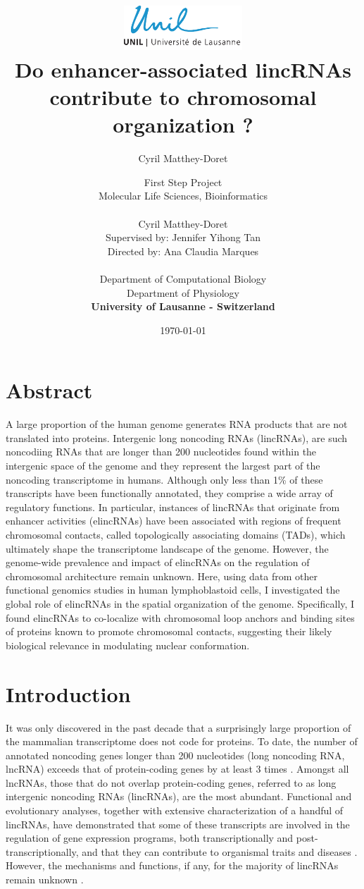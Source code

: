 \documentclass[11pt,a4paper]{report}
\author{Cyril Matthey-Doret}
\title{
\includegraphics[width=1.75in]{lo_unil06_bleu.pdf} \\
\vspace*{1in}
\textbf{Do enhancer-associated lincRNAs contribute to chromosomal organization ?}}
\author{\Large{First Step Project}\\
		Molecular Life Sciences, Bioinformatics\\
				\vspace*{0.5in} \\
		Cyril Matthey-Doret\\
        Supervised by: Jennifer Yihong Tan\\
        Directed by: Ana Claudia Marques\\
		\vspace*{0.5in} \\
		Department of Computational Biology\\
		Department of Physiology\\
        \textbf{University of Lausanne - Switzerland}\\
       } \date{\today}
\begin{document}
\renewcommand{\headrulewidth}{1pt}
\maketitle

\section*{Abstract}

A large proportion of the human genome generates RNA products that are not translated into proteins. Intergenic long noncoding RNAs (lincRNAs), are such noncodiing RNAs that are longer than 200 nucleotides found within the intergenic space of the genome and they represent the largest part of the noncoding transcriptome in humans. Although only less than 1\% of these transcripts have been functionally annotated, they comprise a wide array of regulatory functions. In particular, instances of lincRNAs that originate from enhancer activities (elincRNAs) have been associated with regions of frequent chromosomal contacts, called topologically associating domains (TADs), which ultimately shape the transcriptome landscape of the genome. However, the genome-wide prevalence and impact of elincRNAs on the regulation of chromosomal architecture remain unknown. Here, using data from other functional genomics studies in human lymphoblastoid cells, I investigated the global role of elincRNAs in the spatial organization of the genome. Specifically, I found elincRNAs to co-localize with chromosomal loop anchors and binding sites of proteins known to promote chromosomal contacts, suggesting their likely biological relevance in modulating nuclear conformation.

\section*{Introduction}
It was only discovered in the past decade that a surprisingly large proportion of the mammalian transcriptome does not code for proteins. To date, the number of annotated noncoding genes longer than 200 nucleotides (long noncoding RNA, lncRNA) exceeds that of protein-coding genes by at least 3 times \cite{Iyer2015}⁠. Amongst all lncRNAs, those that do not overlap protein-coding genes, referred to as long intergenic noncoding RNAs (lincRNAs), are the most abundant. Functional and evolutionary analyses, together with extensive characterization of a handful of lincRNAs, have demonstrated that some of these transcripts are involved in the regulation of gene expression programs, both transcriptionally and post-transcriptionally, and that they can contribute to organismal traits and diseases \cite{Kornienko2013}⁠. However, the mechanisms and functions, if any, for the majority of lincRNAs remain unknown \cite{Rinn2012}⁠.  
\end{document}
